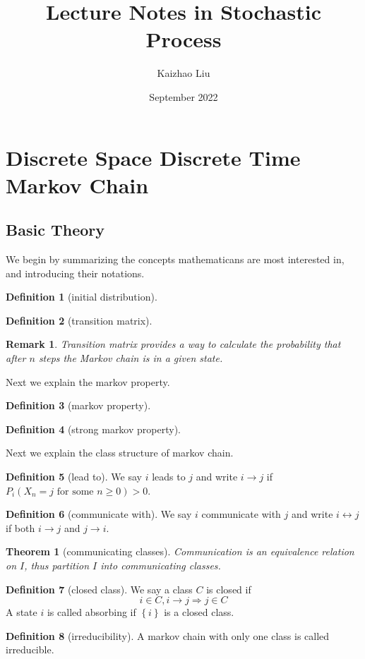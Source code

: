 \documentclass{article}
\title{Lecture Notes in Stochastic Process}
\author{Kaizhao Liu}
\date{September 2022}
\newtheorem{Thm}{Theorem}[section]
\newtheorem*{Rk}{Remark}
\theoremstyle{definition}
\newtheorem{Def}{Definition}[section]
\renewcommand{\geq}{\geqslant}
\newcommand{\<}{\left\langle}
\renewcommand{\>}{\right\rangle}
\begin{document}
\maketitle
\tableofcontents
\section{Discrete Space Discrete Time Markov Chain}
\subsection{Basic Theory}
We begin by summarizing the concepts mathematicans are most interested in, and introducing their notations. 
\begin{Def}[initial distribution]
    
\end{Def}

\begin{Def}[transition matrix]
    
\end{Def}
\begin{Rk}
Transition matrix provides a way to calculate the probability that after $n$ steps the Markov chain is in a given state.
\end{Rk}

Next we explain the markov property.
\begin{Def}[markov property]
    
\end{Def}

\begin{Def}[strong markov property]
    
\end{Def}

Next we explain the class structure of markov chain.

\begin{Def}[lead to]
    We say $i$ leads to $j$ and write $i\to j$ if $P_i(X_n=j\text{ for some }n\geq 0)>0$.
\end{Def}
\begin{Def}[communicate with]
    We say $i$ communicate with $j$ and write $i\leftrightarrow j$ if both $i\to j$ and $j\to i$.
\end{Def}
\begin{Thm}[communicating classes]
    Communication is an equivalence relation on $I$, thus partition $I$ into communicating classes.
\end{Thm}
\begin{Def}[closed class]
    We say a class $C$ is closed if \[i\in C,i\to j\Longrightarrow j\in C\]
    A state $i$ is called absorbing if $\left\{i\right\}$ is a closed class.
\end{Def}
\begin{Def}[irreducibility]
    A markov chain with only one class is called irreducible.
\end{Def}
\end{document}

